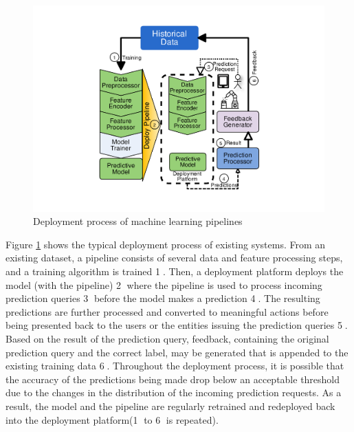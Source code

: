 \begin{figure}[h!]
\centering
\includegraphics[width=\columnwidth]{../images/generic-motivational-example.pdf}
\caption{Deployment process of machine learning pipelines}
\label{fig:motivational-example}
\end{figure}

Figure \ref{fig:motivational-example} shows the typical deployment process of existing systems.
From an existing dataset, a pipeline consists of several data and feature processing steps, and a training algorithm is trained \textcircled{1}.
Then, a deployment platform deploys the model (with the pipeline) \textcircled{2} where the pipeline is used to process incoming prediction queries \textcircled{3} before the model makes a prediction  \textcircled{4}.
The resulting predictions are further processed and converted to meaningful actions before being presented back to the users or the entities issuing the prediction queries \textcircled{5}.
Based on the result of the prediction query, feedback, containing the original prediction query and the correct label, may be generated that is appended to the existing training data \textcircled{6}.
Throughout the deployment process, it is possible that the accuracy of the predictions being made drop below an acceptable threshold due to the changes in the distribution of the incoming prediction requests.
As a result, the model and the pipeline are regularly retrained and redeployed back into the deployment platform(\textcircled{1} to \textcircled{6} is repeated).


